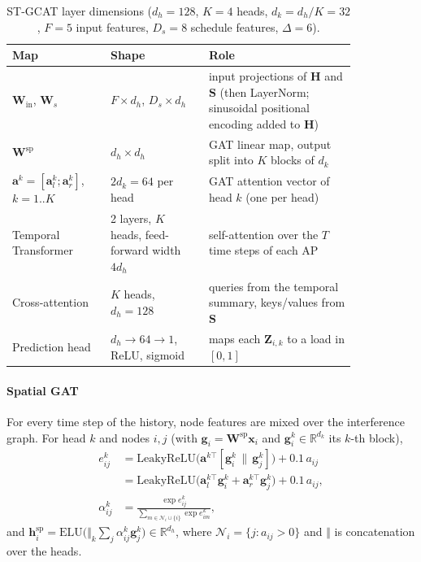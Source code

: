 \begin{table}[htbp]
\centering
\caption{ST-GCAT layer dimensions ($d_h=128$, $K=4$ heads, $d_k=d_h/K=32$, $F=5$ input features, $D_s=8$ schedule features, $\Delta=6$).}
\label{tab:dims}
\small
\begin{tabular}{P{0.24\linewidth}P{0.24\linewidth}P{0.36\linewidth}}
\toprule
\textbf{Map} & \textbf{Shape} & \textbf{Role} \\
\midrule
$\mathbf{W}_{\mathrm{in}}$, $\mathbf{W}_{s}$ & $F\times d_h$, $D_s\times d_h$ & input projections of $\mathbf{H}$ and $\mathbf{S}$ (then LayerNorm; sinusoidal positional encoding added to $\mathbf{H}$) \\
$\mathbf{W}^{\mathrm{sp}}$ & $d_h\times d_h$ & GAT linear map, output split into $K$ blocks of $d_k$ \\
$\mathbf{a}^{k}=[\mathbf{a}^k_l;\mathbf{a}^k_r]$, $k=1..K$ & $2d_k=64$ per head & GAT attention vector of head $k$ (one per head) \\
Temporal Transformer & 2 layers, $K$ heads, feed-forward width $4d_h$ & self-attention over the $T$ time steps of each AP \\
Cross-attention & $K$ heads, $d_h=128$ & queries from the temporal summary, keys/values from $\mathbf{S}$ \\
Prediction head & $d_h\to 64\to 1$, ReLU, sigmoid & maps each $\mathbf{Z}_{i,k}$ to a load in $[0,1]$ \\
\bottomrule
\end{tabular}
\end{table}

\paragraph{Spatial GAT} For every time step of the history, node features are mixed over the interference graph. For head $k$ and nodes $i,j$ (with $\mathbf{g}_i=\mathbf{W}^{\mathrm{sp}}\mathbf{x}_i$ and $\mathbf{g}^k_i\in\mathbb{R}^{d_k}$ its $k$-th block),
\begin{align}
  e^k_{ij}&=\mathrm{LeakyReLU}\big(\mathbf{a}^{k\top}[\mathbf{g}^k_i\,\|\,\mathbf{g}^k_j]\big)+0.1\,a_{ij}\nonumber\\
  &=\mathrm{LeakyReLU}\big(\mathbf{a}^{k\top}_l\mathbf{g}^k_i+\mathbf{a}^{k\top}_r\mathbf{g}^k_j\big)+0.1\,a_{ij},\nonumber\\
  \alpha^k_{ij}&=\frac{\exp e^k_{ij}}{\sum_{m\in\mathcal{N}_i\cup\{i\}}\exp e^k_{im}},
  \label{eq:gat}
\end{align}
and $\mathbf{h}^{\mathrm{sp}}_i=\mathrm{ELU}\big(\Vert_{k}\sum_{j}\alpha^k_{ij}\mathbf{g}^k_j\big)\in\mathbb{R}^{d_h}$, where $\mathcal{N}_i=\{j:a_{ij}>0\}$ and $\Vert$ is concatenation over the heads.

